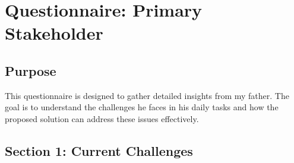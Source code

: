 \section*{Questionnaire: Primary Stakeholder}

\subsection*{Purpose}
This questionnaire is designed to gather detailed insights from my father. The goal is to understand the challenges he faces in his daily tasks and how the proposed solution can address these issues effectively.

\subsection*{Section 1: Current Challenges}

